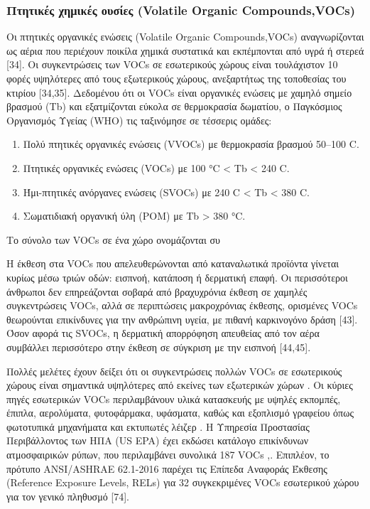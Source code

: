 \subsubsection{Πτητικές χημικές ουσίες (Volatile Organic Compounds,VOCs)}

Οι πτητικές οργανικές ενώσεις (Volatile Organic Compounds,VOCs) αναγνωρίζονται ως αέρια που περιέχουν ποικίλα χημικά συστατικά και εκπέμπονται από υγρά ή στερεά [34]. Οι συγκεντρώσεις των VOCs σε εσωτερικούς χώρους είναι τουλάχιστον 10 φορές υψηλότερες από τους εξωτερικούς χώρους, ανεξαρτήτως της τοποθεσίας του κτιρίου [34,35].
Δεδομένου ότι οι VOCs είναι οργανικές ενώσεις με χαμηλό σημείο βρασμού (Tb) και εξατμίζονται εύκολα σε θερμοκρασία δωματίου, ο Παγκόσμιος Οργανισμός Υγείας (WHO) τις ταξινόμησε σε τέσσερις ομάδες: 
\begin{enumerate}
    \item Πολύ πτητικές οργανικές ενώσεις (VVOCs) με θερμοκρασία βρασμού 50–100 \degree C.
    \item Πτητικές οργανικές ενώσεις (VOCs) με 100 °C < Tb < 240 \degree C.
    \item Ήμι-πτητικές ανόργανες ενώσεις (SVOCs) με 240 \degree C < Tb < 380 \degree C.
    \item Σωματιδιακή οργανική ύλη (POM) με Tb > 380 \degree °C.
\end{enumerate}

Το σύνολο των VOCs σε ένα χώρο ονομάζονται συ

Η έκθεση στα VOCs που απελευθερώνονται από καταναλωτικά προϊόντα γίνεται κυρίως μέσω τριών οδών: εισπνοή, κατάποση ή δερματική επαφή. Οι περισσότεροι άνθρωποι δεν επηρεάζονται σοβαρά από βραχυχρόνια έκθεση σε χαμηλές συγκεντρώσεις VOCs, αλλά σε περιπτώσεις μακροχρόνιας έκθεσης, ορισμένες VOCs θεωρούνται επικίνδυνες για την ανθρώπινη υγεία, με πιθανή καρκινογόνο δράση [43]. Όσον αφορά τις SVOCs, η δερματική απορρόφηση απευθείας από τον αέρα συμβάλλει περισσότερο στην έκθεση σε σύγκριση με την εισπνοή [44,45].\cite{ijerph17082927}

Πολλές μελέτες έχουν δείξει ότι οι συγκεντρώσεις πολλών VOCs σε εσωτερικούς χώρους είναι σημαντικά υψηλότερες από εκείνες των εξωτερικών χώρων . Οι κύριες πηγές εσωτερικών VOCs περιλαμβάνουν υλικά κατασκευής με υψηλές εκπομπές, έπιπλα, αερολύματα, φυτοφάρμακα, υφάσματα, καθώς και εξοπλισμό γραφείου όπως φωτοτυπικά μηχανήματα και εκτυπωτές λέιζερ . Η Υπηρεσία Προστασίας Περιβάλλοντος των ΗΠΑ (US EPA) έχει εκδώσει κατάλογο επικίνδυνων ατμοσφαιρικών ρύπων, που περιλαμβάνει συνολικά 187 VOCs \cite{su12219045},\cite{USAEPA2025}. Επιπλέον, το πρότυπο ANSI/ASHRAE 62.1-2016 παρέχει τις Επίπεδα Αναφοράς Έκθεσης (Reference Exposure Levels, RELs) για 32 συγκεκριμένες VOCs εσωτερικού χώρου για τον γενικό πληθυσμό [74].

